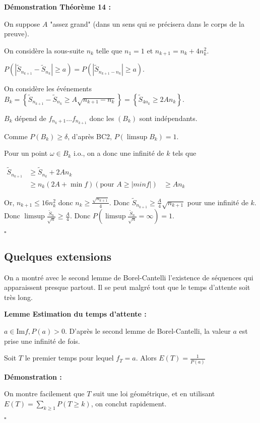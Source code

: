 \documentclass[10pt,a4paper,notitlepage ]{report}
\renewcommand{\Im}{\mathrm{Im }}
\newcounter{th}
\newenvironment{demo}[1][]{

	\textbf{Démonstration #1 :}
}{\begin{flushright}
	$\square$
\end{flushright}
}
\newenvironment{lemme}[1][]{
	\begin{tcolorbox}
		\textbf{Lemme #1 : }
	}
	{\end{tcolorbox}}
\begin{document}
\begin{demo}[Théorème 14]
	On suppose $A$ "assez grand" (dans un sens qui se précisera dans le corps de la preuve).
	
	On considère la sous-suite $n_k$ telle que $n_1=1$ et $n_{k+1}=n_k+4n_k^2$.
	
	$P\left( \left|\tilde S_{n_{k+1}} - \tilde S_{n_k} \right| \ge a \right) = P\left( \left|\tilde S_{n_{k+1} - n_k} \right| \ge a\right)$.
	
	On considère les événements $B_k = \left\{ \tilde S_{n_{k+1}} - \tilde S_{n_k} \ge A\sqrt{n_{k+1} - n_k} \right\} = \left\{ \tilde S_{4n_k} \ge 2An_k \right\}$.
	
	$B_k$ dépend de $f_{n_k+1} \dots f_{n_{k+1}}$ donc les $(B_k)$ sont indépendants.
	
	Comme $P(B_k) \ge \delta$, d'après BC2, $P(\limsup B_k) = 1$.
	
	Pour un point $\omega \in B_k \text{ i.o.}$, on a donc une infinité de $k$ tels que
	
	$\begin{aligned}
		\tilde S_{n_{k+1}} &\ge \tilde S_{n_k} +2An_k \\
		&\ge n_k(2A+\min f)
		(\text{pour } A \ge |min f|) &\ge An_k
		\end{aligned}$
	
	Or, $n_{k+1} \le 16n_k^2$ donc $n_k \ge \frac {\sqrt{n_{k+1}}} 4$. Donc $\tilde S_{n_{k+1}} \ge \frac A 4 \sqrt{n_{k+1}}$ pour une infinité de $k$. Donc $\limsup \frac {\tilde S_n} {\sqrt n} \ge \frac A 4$. Donc $P(\limsup \frac{\tilde S_n}{\sqrt n} = \infty) = 1$.
\end{demo}

\subsection{Quelques extensions}

On a montré avec le second lemme de Borel-Cantelli l'existence de séquences qui apparaissent presque partout. Il se peut malgré tout que le temps d'attente soit très long.

\begin{lemme}[Estimation du temps d'attente]
	$a\in \Im f, P(a) > 0$. D'après le second lemme de Borel-Cantelli, la valeur $a$ est prise une infinité de fois.
	
	Soit $T$ le premier temps pour lequel $f_T=a$. Alors $E(T) = \frac 1 {P(a)}$
\end{lemme}

\begin{demo}
	On montre facilement que $T$ suit une loi géométrique, et en utilisant $E(T) = \underset{k\ge 1} \sum P(T\ge k)$, on conclut rapidement.
\end{demo}
\end{document}
